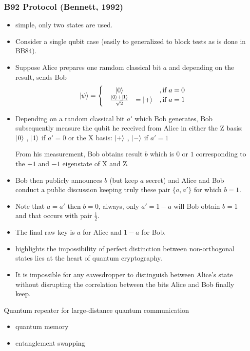 \documentclass[]{book}
\theoremstyle{nonumberplain}
\begin{document}
\subsubsection{B92 Protocol (Bennett, 1992)}
\begin{itemize}
    \item simple, only two states are used.
    \item Consider a single qubit case (easily to generalized to block tests as is done in BB84).
    \item Suppose Alice prepares one ramdom classical bit $a$ and depending on the result, sends Bob
    $$\ket{\psi} = \left\{\begin{matrix}
        &\ket{0} &&, \text{if } a = 0 \\ 
        &\frac{\ket{0} + \ket{1}}{\sqrt{2}} &= \ket{+}&, \text{if } a = 1
    \end{matrix}\right. $$
    \item Depending on a random classical bit $a'$ which Bob generates, Bob subsequently measure the qubit he received from Alice in either the Z basis: $\ket{0}$ , $\ket{1}$ if $a'=0$ or the X basis: $\ket{+}$ , $\ket{-}$ if $a'=1$

    From his measurement, Bob obtains result $b$ which is $0$ or $1$ corresponding to the $+1$ and $-1$ eigenstate of X and Z.
    \item Bob then publicly announces $b$ (but keep $a$ secret) and Alice and Bob conduct a public discussion keeping truly these pair $\{a, a'\}$ for which $b = 1$.
    \item Note that $a = a'$ then $b = 0$, always, only $a' = 1-a$ will Bob obtain $b = 1$ and that occurs with pair $\frac{1}{2}$.
    \item The final raw key is $a$ for Alice and $1-a$ for Bob. 
    \item highlights the impossibility of perfect distinction between non-orthogonal states lies at the heart of quantum cryptography.
    \item It is impossible for any eavesdropper to distinguish between Alice's state without disrupting the correlation between the bits Alice and Bob finally keep.
\end{itemize}
Quantum repeater for large-distance quantum communication
\begin{itemize}
    \item quantum memory
    \item entanglement swapping
\end{itemize}
\end{document}
